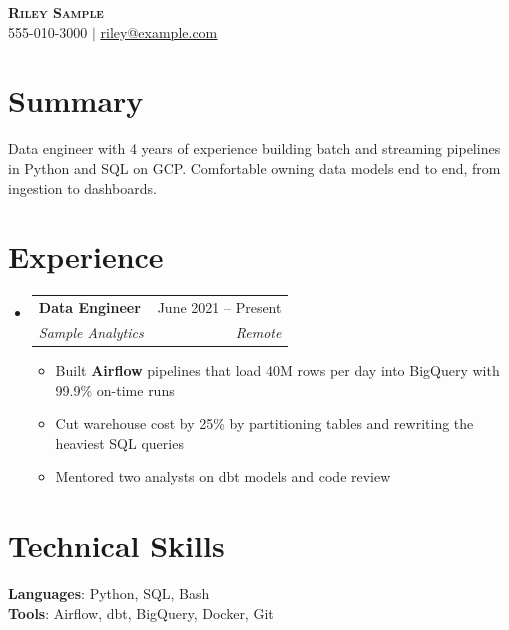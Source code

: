 \documentclass[letterpaper,11pt]{article}
\makeatletter
\newcommand{\resumeItem}[1]{\item\small{{#1 \vspace{-2pt}}}}
\newcommand{\resumeSubheading}[4]{
  \vspace{-2pt}\item
    \begin{tabular*}{0.97\textwidth}[t]{l@{\extracolsep{\fill}}r}
      \textbf{#1} & #2 \\
      \textit{\small#3} & \textit{\small #4} \\
    \end{tabular*}\vspace{-7pt}
}
\newcommand{\resumeSubHeadingListStart}{\begin{itemize}[leftmargin=0.15in, label={}]}
\newcommand{\resumeSubHeadingListEnd}{\end{itemize}}
\newcommand{\resumeItemListStart}{\begin{itemize}}
\newcommand{\resumeItemListEnd}{\end{itemize}\vspace{-5pt}}
\makeatother
\begin{document}
\begin{center}
    \textbf{\Huge \scshape Riley Sample} \\ \vspace{1pt}
    \small 555-010-3000 $|$ \href{mailto:riley@example.com}{\underline{riley@example.com}}
\end{center}

\section{Summary}
{\small Data engineer with 4 years of experience building batch and streaming pipelines in Python and SQL on GCP. Comfortable owning data models end to end, from ingestion to dashboards.}

\section{Experience}
  \resumeSubHeadingListStart
    \resumeSubheading
      {Data Engineer}{June 2021 -- Present}
      {Sample Analytics}{Remote}
      \resumeItemListStart
        \resumeItem{Built \textbf{Airflow} pipelines that load 40M rows per day into BigQuery with 99.9\% on-time runs}
        \resumeItem{Cut warehouse cost by 25\% by partitioning tables and rewriting the heaviest SQL queries}
        \resumeItem{Mentored two analysts on dbt models and code review}
      \resumeItemListEnd
  \resumeSubHeadingListEnd

\section{Technical Skills}
 \begin{itemize}[leftmargin=0.15in, label={}]
    \small{\item{
     \textbf{Languages}{: Python, SQL, Bash} \\
     \textbf{Tools}{: Airflow, dbt, BigQuery, Docker, Git}
    }}
 \end{itemize}
\end{document}
